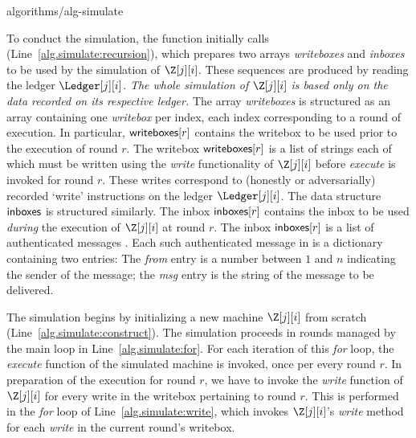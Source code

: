 {algorithms/alg-simulate}

To conduct the simulation, the \simulate function initially calls
\prepareSimulationInputs (Line~\ref{alg.simulate:recursion}),
which prepares two arrays \emph{writeboxes}
and \emph{inboxes} to be used by the simulation of $\Z[j][i]$.
These sequences are produced by reading the ledger $\Ledger[j][i]$.
\emph{The whole simulation of $\Z[j][i]$ is based only on the data
recorded on its respective ledger.}
The array \emph{writeboxes} is structured as an array containing
one \emph{writebox} per index, each index corresponding to a
round of execution. In particular, $\textsf{writeboxes}[r]$ contains the
writebox to be used prior to the execution of round $r$.
The writebox $\textsf{writeboxes}[r]$ is a list of strings each of which must be
written using the \emph{write} functionality of $\Z[j][i]$
before \emph{execute} is invoked for round $r$.
These writes correspond to (honestly or adversarially) recorded
`write' instructions on the ledger $\Ledger[j][i]$.
The data structure $\textsf{inboxes}$ is structured similarly.
The inbox $\textsf{inboxes}[r]$ contains the inbox to be used \emph{during}
the execution of $\Z[j][i]$ at round $r$. The inbox $\textsf{inboxes}[r]$
is a list of authenticated messages \netins. Each such authenticated
message \netin in \netins is a dictionary containing two entries:
The \emph{from} entry is a number between $1$ and $n$ indicating the
sender of the message; the \emph{msg} entry is the string of
the message to be delivered.

The simulation begins by initializing a new machine $\Z[j][i]$
from scratch (Line~\ref{alg.simulate:construct}). The simulation
proceeds in rounds managed by the main loop in
Line~\ref{alg.simulate:for}. For each iteration of this \emph{for}
loop, the \emph{execute} function of the simulated machine
is invoked, once per every round $r$. In preparation of the
execution for round $r$, we have to invoke the \emph{write}
function of $\Z[j][i]$ for every write in the writebox pertaining
to round $r$. This is performed in the \emph{for} loop of
Line~\ref{alg.simulate:write}, which invokes $\Z[j][i]$'s
\emph{write} method for each \emph{write} in the current
round's writebox.


